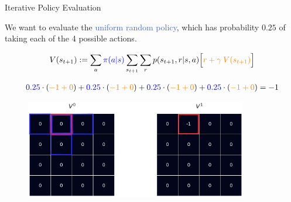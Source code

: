 \documentclass{beamer}
\begin{document}
\begin{frame}{Iterative Policy Evaluation}

\begin{small}

We want to evaluate the \textcolor{RoyalBlue}{uniform random policy}, which has probability $0.25$ of taking each of the 4 possible actions.

\begin{align*}
    V(s_{t+1}) := \sum_a \textcolor{blue}{\pi(a|s)} \sum_{s_{t+1}} \sum_r p(s_{t+1},r|s,a)\Big[\textcolor{orange}{r+\gamma\:V(s_{t+1})}\Big]
\end{align*}
\end{small}
\begin{footnotesize}
\begin{align*}
    \textcolor{blue}{0.25}\cdot(\textcolor{orange}{-1 + 0}) + \textcolor{blue}{0.25}\cdot(\textcolor{orange}{-1+0}) + \textcolor{blue}{0.25}\cdot(\textcolor{orange}{-1+0})+ \textcolor{blue}{0.25}\cdot(\textcolor{orange}{-1+0}) = -1
\end{align*}

\end{footnotesize}

\begin{figure}[t]
\includegraphics[width=9.7cm]{./images/step00.png}
\centering
\end{figure}

\end{frame}
\end{document}
